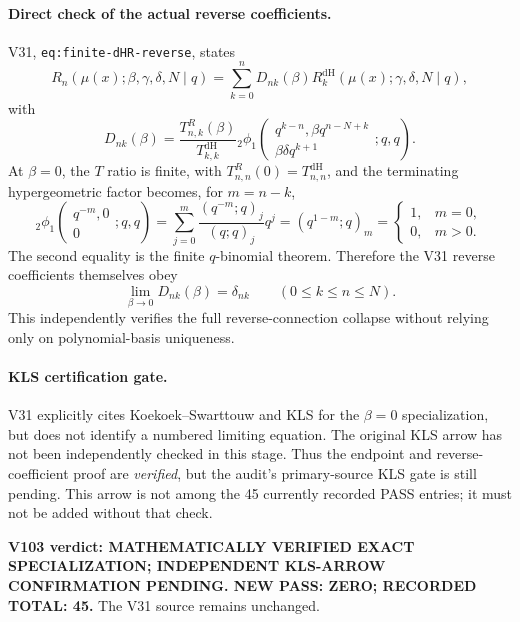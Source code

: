 \documentclass[11pt]{article}
\begin{document}
\paragraph{Direct check of the actual reverse coefficients.} V31, \texttt{eq:finite-dHR-reverse}, states
\[
R_n(\mu(x);\beta,\gamma,\delta,N\mid q)
=\sum_{k=0}^{n}D_{nk}(\beta)R_k^{\mathrm{dH}}(\mu(x);\gamma,\delta,N\mid q),
\]
with
\[
D_{nk}(\beta)=\frac{T^R_{n,k}(\beta)}{T^{\mathrm{dH}}_{k,k}}
{}_2\phi_1\!\left(\begin{matrix}q^{k-n},\beta q^{n-N+k}\\\beta\delta q^{k+1}\end{matrix};q,q\right).
\]
At $\beta=0$, the $T$ ratio is finite, with $T^R_{n,n}(0)=T^{\mathrm{dH}}_{n,n}$, and the terminating hypergeometric factor becomes, for $m=n-k$,
\[
{}_2\phi_1\!\left(\begin{matrix}q^{-m},0\\0\end{matrix};q,q\right)
=\sum_{j=0}^{m}\frac{(q^{-m};q)_j}{(q;q)_j}q^j
=(q^{1-m};q)_m
=\begin{cases}1,&m=0,\\0,&m>0.\end{cases}
\]
The second equality is the finite $q$-binomial theorem. Therefore the V31 reverse coefficients themselves obey
\begin{equation}\label{eq:v103-reverse-delta}
\boxed{\lim_{\beta\to0}D_{nk}(\beta)=\delta_{nk}\qquad(0\le k\le n\le N).}
\end{equation}
This independently verifies the full reverse-connection collapse without relying only on polynomial-basis uniqueness.

\paragraph{KLS certification gate.} V31 explicitly cites Koekoek--Swarttouw and KLS for the $\beta=0$ specialization, but does not identify a numbered limiting equation. The original KLS arrow has not been independently checked in this stage. Thus the endpoint and reverse-coefficient proof are \emph{verified}, but the audit's primary-source KLS gate is still pending. This arrow is not among the 45 currently recorded PASS entries; it must not be added without that check.

\noindent\textbf{V103 verdict: MATHEMATICALLY VERIFIED EXACT SPECIALIZATION; INDEPENDENT KLS-ARROW CONFIRMATION PENDING. NEW PASS: ZERO; RECORDED TOTAL: 45.} The V31 source remains unchanged.
\end{document}
